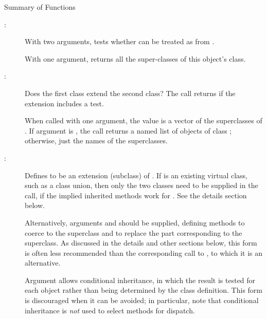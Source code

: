 %
\begin{Section}{Summary of Functions}
\begin{description}

\item[:] 
With two arguments, tests whether  can be treated as from
.

With one argument, returns all the super-classes of this object's class.

\item[:] 
Does the first class extend the second class?
The call returns  if the extension includes a test.

When called with one argument, the value is a vector of the
superclasses of .  If argument   is
, the call returns a named list of objects of class
; otherwise, just the names of
the superclasses.

\item[:] 
Defines  to be an extension (subclass) of
.
If  is an existing virtual class, such as a class
union, then only the two classes need to be supplied in the
call, if the implied inherited methods work for .
See the details section below.

Alternatively, arguments  and  should
be supplied, defining methods to coerce to the superclass and to
replace the part corresponding to the superclass. As discussed in
the details and other sections below, this form is often less
recommended than the corresponding call to , to
which it is an alternative.

Argument  allows conditional inheritance, in which
the  result is tested for each object rather than
being determined by the class definition.  This form is
discouraged when it can be avoided; in particular, note that
conditional inheritance is \emph{not} used to select methods for
dispatch.


\end{description}

\end{Section}
%
